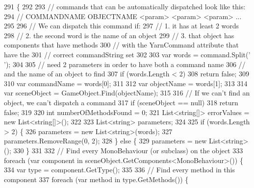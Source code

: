 \begin{DoxyCode}
291                                                     \{
292 
293             \textcolor{comment}{// commands that can be automatically dispatched look like this:}
294             \textcolor{comment}{// COMMANDNAME OBJECTNAME <param> <param> <param> ...}
295 
296             \textcolor{comment}{// We can dispatch this command if:}
297             \textcolor{comment}{// 1. it has at least 2 words}
298             \textcolor{comment}{// 2. the second word is the name of an object}
299             \textcolor{comment}{// 3. that object has components that have methods }
300             \textcolor{comment}{//    with the YarnCommand attribute that have the}
301             \textcolor{comment}{//    correct commandString set}
302 
303             var words = command.Split(\textcolor{charliteral}{' '});
304 
305             \textcolor{comment}{// need 2 parameters in order to have both a command name}
306             \textcolor{comment}{// and the name of an object to find}
307             \textcolor{keywordflow}{if} (words.Length < 2)
308                 \textcolor{keywordflow}{return} \textcolor{keyword}{false};
309 
310             var commandName = words[0];
311 
312             var objectName = words[1];
313 
314             var sceneObject = GameObject.Find(objectName);
315 
316             \textcolor{comment}{// If we can't find an object, we can't dispatch a command}
317             \textcolor{keywordflow}{if} (sceneObject == null)
318                 \textcolor{keywordflow}{return} \textcolor{keyword}{false};
319 
320             \textcolor{keywordtype}{int} numberOfMethodsFound = 0;
321             List<string[]> errorValues = \textcolor{keyword}{new} List<string[]>();
322 
323             List<string> parameters;
324 
325             \textcolor{keywordflow}{if} (words.Length > 2) \{
326                 parameters = \textcolor{keyword}{new} List<string>(words);
327                 parameters.RemoveRange(0, 2);
328             \} \textcolor{keywordflow}{else} \{
329                 parameters = \textcolor{keyword}{new} List<string>();
330             \}
331 
332             \textcolor{comment}{// Find every MonoBehaviour (or subclass) on the object}
333             \textcolor{keywordflow}{foreach} (var component \textcolor{keywordflow}{in} sceneObject.GetComponents<MonoBehaviour>()) \{
334                 var type = component.GetType();
335 
336                 \textcolor{comment}{// Find every method in this component}
337                 \textcolor{keywordflow}{foreach} (var method \textcolor{keywordflow}{in} type.GetMethods()) \{

\end{DoxyCode}
